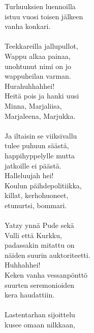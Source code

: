             Turhuuksien luennoilla \\
            istuu vuosi toisen jälkeen \\
            vanha konkari. \\
\hspace{10mm} \\
            Teekkareilla jallupullot, \\
            Wappu alkaa painaa, \\
            unohtunut nimi on jo \\
            wappuheilan varman. \\
            Hurahuhhahhei! \\
            Heitä pois ja hanki uusi \\
            Minna, Marjaliisa, \\
            Marjaleena, Marjukka. \\
\hspace{10mm} \\
            Ja iltaisin se viiksivallu \\
            tulee puhuun säästä, \\
            happihyppelylle mutta \\
            jatkoille ei päästä. \\
            Halleluujah hei! \\
            Koulun päihdepolitiikka, \\
            killat, kerhohuoneet, \\
            etunurtsi, bommari. \\
\hspace{10mm} \\
            Yatzy ynnä Pude sekä \\
            Vulli että Kurkku, \\
            padassakin mitattu on \\
            näiden suurin auktoriteetti. \\
            Huhhahhei! \\
            Keken vanha vessanpönttö \\
            suurten seremonioiden \\
            kera haudattiin. \\
\hspace{10mm} \\
            Lastentarhan sijoittelu \\
            kusee omaan nilkkaan, \\
